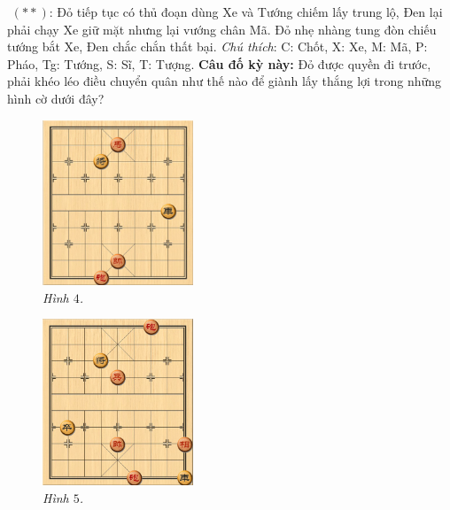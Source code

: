 \begin{multicols}{2}
$${	\vskip 0.1cm
	$(**)$: Đỏ tiếp tục có thủ đoạn dùng Xe và Tướng chiếm lấy trung lộ, Đen lại phải chạy Xe giữ mặt nhưng lại vướng chân Mã. Đỏ nhẹ nhàng tung đòn chiếu tướng bắt Xe, Đen chắc chắn thất bại.}
	\vskip 0.1cm
	\textit{Chú thích}: C: Chốt, X: Xe, M: Mã, P: Pháo, Tg: Tướng, S: Sĩ, T: Tượng. 
	\vskip 0.1cm
	\textbf{\color{gocco}Câu đố kỳ này:} Đỏ được quyền đi trước, phải khéo léo điều chuyển quân như thế nào để giành lấy thắng lợi trong những hình cờ dưới đây?
	\begin{figure}[H]
		\vspace*{5pt}
		\centering
		\captionsetup{labelformat= empty, justification=centering}
		\includegraphics[width= 0.4\textwidth]{4}
		\caption{\small\textit{\color{gocco}Hình $4$.}}
		\vspace*{-10pt}
	\end{figure}
	\begin{figure}[H]
		\vspace*{-5pt}
		\centering
		\captionsetup{labelformat= empty, justification=centering}
		\includegraphics[width= 0.4\textwidth]{5}
		\caption{\small\textit{\color{gocco}Hình $5$.}}
		\vspace*{-10pt}
	\end{figure}
\end{multicols}




